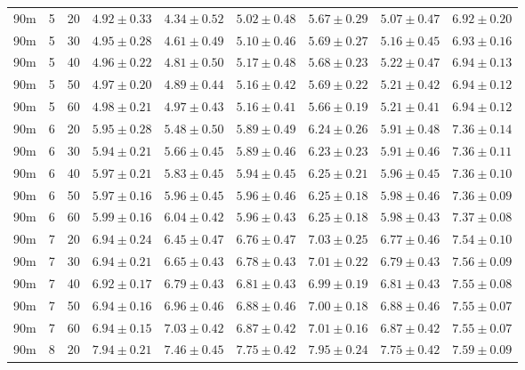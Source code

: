 \begin{table}
\begin{center}
\begin{tabular}{ccc|c|ccccc}
   \hline
90m &   5 &  20 & $4.92 \pm 0.33$ & $4.34 \pm 0.52$ & $5.02 \pm 0.48$ & $5.67 \pm 0.29$ & $5.07 \pm 0.47$ & $6.92 \pm 0.20$ \\ 
  90m &   5 &  30 & $4.95 \pm 0.28$ & $4.61 \pm 0.49$ & $5.10 \pm 0.46$ & $5.69 \pm 0.27$ & $5.16 \pm 0.45$ & $6.93 \pm 0.16$ \\ 
  90m &   5 &  40 & $4.96 \pm 0.22$ & $4.81 \pm 0.50$ & $5.17 \pm 0.48$ & $5.68 \pm 0.23$ & $5.22 \pm 0.47$ & $6.94 \pm 0.13$ \\ 
  90m &   5 &  50 & $4.97 \pm 0.20$ & $4.89 \pm 0.44$ & $5.16 \pm 0.42$ & $5.69 \pm 0.22$ & $5.21 \pm 0.42$ & $6.94 \pm 0.12$ \\ 
  90m &   5 &  60 & $4.98 \pm 0.21$ & $4.97 \pm 0.43$ & $5.16 \pm 0.41$ & $5.66 \pm 0.19$ & $5.21 \pm 0.41$ & $6.94 \pm 0.12$ \\ 
   \hline
90m &   6 &  20 & $5.95 \pm 0.28$ & $5.48 \pm 0.50$ & $5.89 \pm 0.49$ & $6.24 \pm 0.26$ & $5.91 \pm 0.48$ & $7.36 \pm 0.14$ \\ 
  90m &   6 &  30 & $5.94 \pm 0.21$ & $5.66 \pm 0.45$ & $5.89 \pm 0.46$ & $6.23 \pm 0.23$ & $5.91 \pm 0.46$ & $7.36 \pm 0.11$ \\ 
  90m &   6 &  40 & $5.97 \pm 0.21$ & $5.83 \pm 0.45$ & $5.94 \pm 0.45$ & $6.25 \pm 0.21$ & $5.96 \pm 0.45$ & $7.36 \pm 0.10$ \\ 
  90m &   6 &  50 & $5.97 \pm 0.16$ & $5.96 \pm 0.45$ & $5.96 \pm 0.46$ & $6.25 \pm 0.18$ & $5.98 \pm 0.46$ & $7.36 \pm 0.09$ \\ 
  90m &   6 &  60 & $5.99 \pm 0.16$ & $6.04 \pm 0.42$ & $5.96 \pm 0.43$ & $6.25 \pm 0.18$ & $5.98 \pm 0.43$ & $7.37 \pm 0.08$ \\ 
   \hline
90m &   7 &  20 & $6.94 \pm 0.24$ & $6.45 \pm 0.47$ & $6.76 \pm 0.47$ & $7.03 \pm 0.25$ & $6.77 \pm 0.46$ & $7.54 \pm 0.10$ \\ 
  90m &   7 &  30 & $6.94 \pm 0.21$ & $6.65 \pm 0.43$ & $6.78 \pm 0.43$ & $7.01 \pm 0.22$ & $6.79 \pm 0.43$ & $7.56 \pm 0.09$ \\ 
  90m &   7 &  40 & $6.92 \pm 0.17$ & $6.79 \pm 0.43$ & $6.81 \pm 0.43$ & $6.99 \pm 0.19$ & $6.81 \pm 0.43$ & $7.55 \pm 0.08$ \\ 
  90m &   7 &  50 & $6.94 \pm 0.16$ & $6.96 \pm 0.46$ & $6.88 \pm 0.46$ & $7.00 \pm 0.18$ & $6.88 \pm 0.46$ & $7.55 \pm 0.07$ \\ 
  90m &   7 &  60 & $6.94 \pm 0.15$ & $7.03 \pm 0.42$ & $6.87 \pm 0.42$ & $7.01 \pm 0.16$ & $6.87 \pm 0.42$ & $7.55 \pm 0.07$ \\ 
   \hline
90m &   8 &  20 & $7.94 \pm 0.21$ & $7.46 \pm 0.45$ & $7.75 \pm 0.42$ & $7.95 \pm 0.24$ & $7.75 \pm 0.42$ & $7.59 \pm 0.09$ \\ 

\end{tabular}
\end{center}
\end{table}
